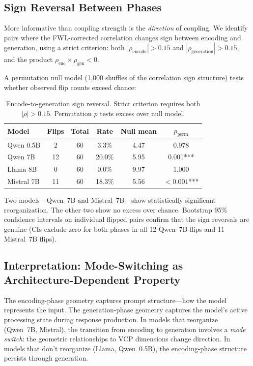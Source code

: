 \documentclass[11pt,a4paper]{article}
\begin{document}
\subsection{Sign Reversal Between Phases}

More informative than coupling strength is the \emph{direction} of coupling. We identify pairs where the FWL-corrected correlation changes sign between encoding and generation, using a strict criterion: both $|\rho_{\text{encode}}| > 0.15$ and $|\rho_{\text{generation}}| > 0.15$, and the product $\rho_{\text{enc}} \times \rho_{\text{gen}} < 0$.

A permutation null model (1,000 shuffles of the correlation sign structure) tests whether observed flip counts exceed chance:

\begin{table}[H]
\centering
\caption{Encode-to-generation sign reversal. Strict criterion requires both $|\rho| > 0.15$. Permutation $p$ tests excess over null model.}
\label{tab:sign_reversal}
\begin{tabular}{lccccc}
\toprule
\textbf{Model} & \textbf{Flips} & \textbf{Total} & \textbf{Rate} & \textbf{Null mean} & \textbf{$p_{\text{perm}}$} \\
\midrule
Qwen 0.5B  & 2  & 60 & 3.3\%  & 4.47 & 0.978 \\
Qwen 7B    & 12 & 60 & 20.0\% & 5.95 & 0.001*** \\
Llama 8B   & 0  & 60 & 0.0\%  & 9.97 & 1.000 \\
Mistral 7B & 11 & 60 & 18.3\% & 5.56 & ${<}0.001$*** \\
\bottomrule
\end{tabular}
\end{table}

Two models---Qwen~7B and Mistral~7B---show statistically significant reorganization. The other two show no excess over chance. Bootstrap 95\% confidence intervals on individual flipped pairs confirm that the sign reversals are genuine (CIs exclude zero for both phases in all 12 Qwen~7B flips and 11 Mistral~7B flips).

\subsection{Interpretation: Mode-Switching as Architecture-Dependent Property}

The encoding-phase geometry captures prompt structure---how the model represents the input. The generation-phase geometry captures the model's active processing state during response production. In models that reorganize (Qwen~7B, Mistral), the transition from encoding to generation involves a \emph{mode switch}: the geometric relationships to VCP dimensions change direction. In models that don't reorganize (Llama, Qwen~0.5B), the encoding-phase structure persists through generation.
\end{document}
